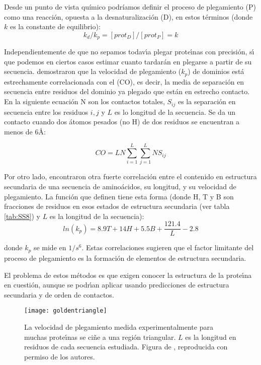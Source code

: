 Desde un punto de vista qu\'{i}mico podr\'{i}amos definir el proceso de plegamiento (P) como una reacci\'{o}n, opuesta a la 
desnaturalizaci\'{o}n (D), en estos t\'{e}rminos (donde $k$ es la constante de equilibrio):
\begin{equation}
k_{d}/k_{p}=[prot_{D}]/[prot_{P}] = k
\end{equation}

Independientemente de que no sepamos todav\'\i{}a plegar 
prote\'\i{}nas con precisi\'{o}n, s\'\i{} que podemos 
en ciertos casos estimar cuanto tardar\'{a}n en plegarse a partir de su secuencia. \citet{Plaxco1998}
demostraron que la velocidad de plegamiento ($k_{p}$) de dominios est\'{a} estrechamente correlacionada con
el  (CO), es decir, la media de separaci\'{o}n en secuencia entre residuos del dominio
ya plegado que est\'{a}n en estrecho contacto. En la siguiente ecuaci\'{o}n N son los contactos totales, 
$S_{ij}$ es la separaci\'{o}n en secuencia entre los residuos $i,j$ y $L$ es lo longitud de la secuencia.
Se da un contacto cuando dos \'{a}tomos pesados (no H) de dos residuos se encuentran a menos de 6\AA:

\begin{equation}
CO = LN \sum_{i=1}^{L} \sum_{j=1}^{L} N S_{ij}
\end{equation}

Por otro lado, \citet{SSfoldingrate2003} encontraron otra fuerte correlaci\'{o}n entre el contenido
en estructura secundaria de una secuencia de amino\'{a}cidos, su longitud, y su velocidad de plegamiento.
La funci\'{o}n que definen tiene esta forma (donde H, T y B son fracciones de residuos en esos estados de
estructura secundaria (ver tabla \ref{tab:SS8}) y $L$ es la longitud de la secuencia):
\begin{equation}
ln(k_{p}) = 8{.}9T + 14H + 5{.}5B + \frac{121{.}4}{L} - 2{.}8
\end{equation}

donde $k_{p}$ se mide en $1/s^{6}$. Estas correlaciones sugieren que el factor limitante del proceso 
de plegamiento es la formaci\'{o}n de elementos de estructura secundaria.

El problema de estos m\'{e}todos es que exigen conocer la estructura de la prote\'\i{}na en cuesti\'{o}n, aunque
se podr\'\i{}an aplicar usando predicciones de estructura secundaria y de orden de contactos. 

\begin{figure}
\begin{center} 
\texttt{[image: goldentriangle]}
\caption%
{
La velocidad de plegamiento medida experimentalmente para muchas prote\'\i{}nas se ci\~{n}e a una regi\'{o}n triangular.
$L$ es la longitud en residuos de cada secuencia estudiada. Figura de \citet{Garbuzynskiy2013}, reproducida con permiso de los autores.
}
\label{fig:goldentriangle}
\end{center}
\end{figure}


